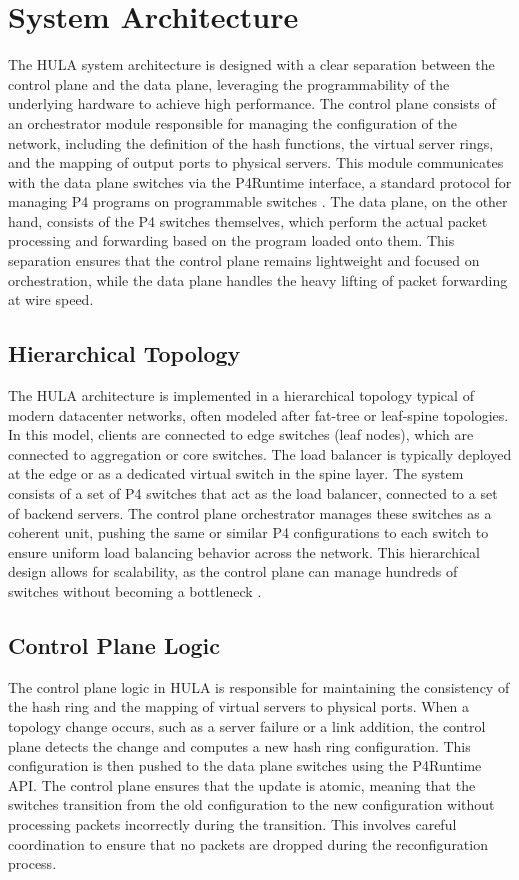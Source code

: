 \documentclass[12pt,a4paper]{article}
\begin{document}
\section{System Architecture}

The HULA system architecture is designed with a clear separation between the control plane and the data plane, leveraging the programmability of the underlying hardware to achieve high performance. The control plane consists of an orchestrator module responsible for managing the configuration of the network, including the definition of the hash functions, the virtual server rings, and the mapping of output ports to physical servers. This module communicates with the data plane switches via the P4Runtime interface, a standard protocol for managing P4 programs on programmable switches \cite{ref14}. The data plane, on the other hand, consists of the P4 switches themselves, which perform the actual packet processing and forwarding based on the program loaded onto them. This separation ensures that the control plane remains lightweight and focused on orchestration, while the data plane handles the heavy lifting of packet forwarding at wire speed.

\subsection{Hierarchical Topology}

The HULA architecture is implemented in a hierarchical topology typical of modern datacenter networks, often modeled after fat-tree or leaf-spine topologies. In this model, clients are connected to edge switches (leaf nodes), which are connected to aggregation or core switches. The load balancer is typically deployed at the edge or as a dedicated virtual switch in the spine layer. The system consists of a set of P4 switches that act as the load balancer, connected to a set of backend servers. The control plane orchestrator manages these switches as a coherent unit, pushing the same or similar P4 configurations to each switch to ensure uniform load balancing behavior across the network. This hierarchical design allows for scalability, as the control plane can manage hundreds of switches without becoming a bottleneck \cite{ref15}.

\subsection{Control Plane Logic}

The control plane logic in HULA is responsible for maintaining the consistency of the hash ring and the mapping of virtual servers to physical ports. When a topology change occurs, such as a server failure or a link addition, the control plane detects the change and computes a new hash ring configuration. This configuration is then pushed to the data plane switches using the P4Runtime API. The control plane ensures that the update is atomic, meaning that the switches transition from the old configuration to the new configuration without processing packets incorrectly during the transition. This involves careful coordination to ensure that no packets are dropped during the reconfiguration process.
\end{document}
